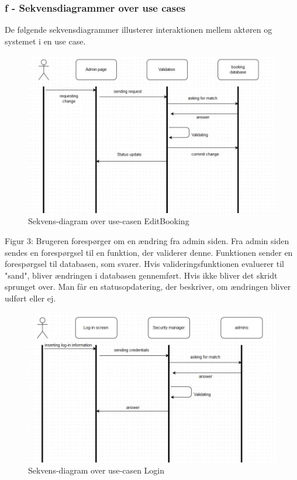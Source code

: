 \documentclass[12pt,a4paper]{article}
\begin{document}
\subsubsection{f - Sekvensdiagrammer over use cases}
De følgende sekvensdiagrammer illusterer interaktionen mellem aktøren og systemet i en use case.\\ 
\begin{figure}[H]
\centering
\includegraphics[scale=0.6]{adminInteraction.jpg}
\caption{Sekvens-diagram over use-casen EditBooking}
\end{figure}
Figur 3: Brugeren forespørger om en ændring fra admin siden. 
Fra admin siden sendes en forespørgsel til en funktion, der validerer denne. 
Funktionen sender en forespørgsel til databasen, som svarer.
Hvis valideringsfunktionen evaluerer til "sand", 
bliver ændringen i databasen gennemført.
Hvis ikke bliver det skridt sprunget over.
Man får en statusopdatering, der beskriver, om ændringen bliver udført eller ej.
\begin{figure}[H]
\centering
\includegraphics[scale=0.6]{adminLog-in.jpg}
\caption{Sekvens-diagram over use-casen Login}
\end{figure}
\end{document}
